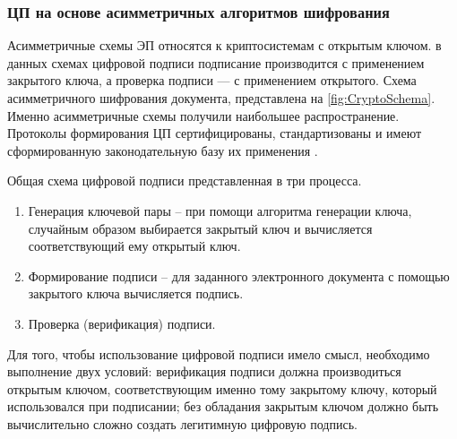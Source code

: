 \subsubsection{ЦП на основе асимметричных алгоритмов шифрования}
\par Асимметричные схемы ЭП относятся к криптосистемам с открытым ключом. в данных схемах цифровой подписи подписание производится с применением закрытого ключа, а проверка подписи — с применением открытого. Схема асимметричного шифрования документа, представлена на \ref{fig:CryptoSchema}. Именно асимметричные схемы получили наибольшее распространение. Протоколы формирования ЦП сертифицированы, стандартизованы и имеют сформированную законодательную базу их применения \cite{gost34.10}. 
\par Общая схема цифровой подписи представленная в \cite{gost34.10} три процесса.
\begin{enumerate}
\item Генерация ключевой пары -- при помощи алгоритма генерации ключа, случайным образом выбирается закрытый ключ и вычисляется соответствующий ему открытый ключ.
\item Формирование подписи -- для заданного электронного документа с помощью закрытого ключа вычисляется подпись.
\item Проверка (верификация) подписи.
\end{enumerate}
\par Для того, чтобы использование цифровой подписи имело смысл, необходимо выполнение двух условий:
верификация подписи должна производиться открытым ключом, соответствующим именно тому закрытому ключу, который использовался при подписании; без обладания закрытым ключом должно быть вычислительно сложно создать легитимную цифровую подпись.














